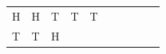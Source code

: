 {{\begin{center}
\begin{tabular}[t]{|l|l|l|l|l|l|l|l|l|l|}
    
        H &
    
    
        H &
    
    
        T &
    
    
        T &
    
    
        T%
     \tabularnewline\cline{1-1}\cline{2-2}\cline{3-3}\cline{4-4}\cline{5-5}\cline{6-6}\cline{7-7}\cline{8-8}\cline{9-9}\cline{10-10}
    
    
        T &
    
    
        T &
    
    
        H &
    
    

\end{tabular}
\end{center}}}
